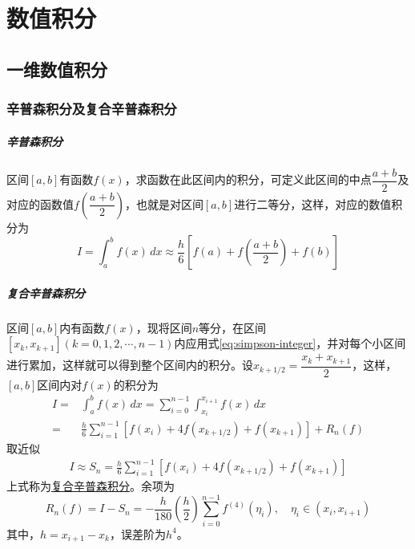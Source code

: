 \chapter{数值积分}

\section{一维数值积分}
\subsection{辛普森积分及复合辛普森积分}
\paragraph*{辛普森积分} 区间$[a, b]$有函数$f(x)$，求函数在此区间内的积分，可定义此区间的中点$\dfrac{a+b}{2}$及对应的函数值$f(\dfrac{a+b}{2})$，也就是对区间$[a, b]$进行二等分，这样，对应的数值积分为
\begin{equation}
	I = \int_{a}^{b} f(x) \, dx \approx \frac{h}{6}\left[ f(a) + f(\frac{a+b}{2}) + f(b) \right]	\label{eq:simpson-integer}
\end{equation} 

\paragraph*{复合辛普森积分} 区间$[a, b]$内有函数$f(x)$，现将区间$n$等分，在区间$[x_{k}, x_{k+1}](k = 0, 1, 2, \cdots, n-1)$内应用式\eqref{eq:simpson-integer}，并对每个小区间进行累加，这样就可以得到整个区间内的积分。设$x_{k+1/2} = \dfrac{x_k + x_{k+1}}{2}$，这样，$[a, b]$区间内对$f(x)$的积分为
\begin{equation}
    \begin{aligned}
		I =& \int_{a}^{b} f(x) \, dx = \sum_{i = 0}^{n - 1}\int_{x_i}^{x_{i+1}} f(x) \, dx	\\
		=& \frac{h}{6}\sum_{i=1}^{n-1} \left[ f(x_i) + 4f(x_{k+1/2}) + f(x_{k+1})  \right] + R_n(f)
    \end{aligned}
\end{equation} 
取近似
\begin{equation}
    \begin{aligned}
    	I \approx S_n = \frac{h}{6}\sum_{i=1}^{n-1} \left[ f(x_i) + 4f(x_{k+1/2}) + f(x_{k+1})  \right]
    \end{aligned}
\end{equation} 
上式称为\uline{复合辛普森积分}。余项为
\begin{equation}
	R_n(f) = I - S_n = -\frac{h}{180} \left(\frac{h}{2} \right) \sum_{i = 0}^{n-1}f^{(4)}(\eta_i), \quad \eta_i \in (x_i, x_{i+1})
\end{equation} 
其中，$h = x_{i+1} - x_{k}$，误差阶为$h^4$。

